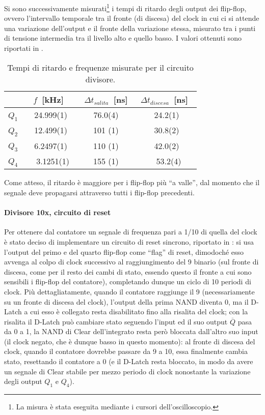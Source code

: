 Si sono successivamente misurati\footnote{La misura è stata eseguita mediante i cursori dell'oscilloscopio.} i tempi di ritardo degli output dei flip-flop, ovvero l'intervallo temporale tra il fronte (di discesa) del clock in cui ci si attende una variazione dell'output e il fronte della variazione stessa, misurato tra i punti di tensione intermedia tra il livello alto e quello basso. I valori ottenuti sono riportati in . %

\begin{table}[h]
	\centering
	\begin{tabular}{l S[table-figures-decimal=4, table-figures-uncertainty=1] S[table-figures-decimal=1, table-figures-integer=3, table-figures-uncertainty=1] S[table-figures-decimal=1, table-figures-uncertainty=1] }
		\toprule
			& {$f$ [\si{\kHz}]} & {$\Delta t_{salita}$ [\si{\ns}]} & {$\Delta t_{discesa}$ [\si{\ns}]} \\
		\midrule
		$Q_1$ & 24.999(1) & 76.0(4) & 24.2(1) \\
		$Q_2$ & 12.499(1) & 101 (1) & 30.8(2) \\
		$Q_3$ & 6.2497(1) & 110 (1) & 42.0(2) \\
		$Q_4$ & 3.1251(1) & 155 (1) & 53.2(4) \\
		\bottomrule
	\end{tabular}
	\caption{Tempi di ritardo e frequenze misurate per il circuito divisore.}
	\label{tab:divlag}
\end{table}

Come atteso, il ritardo è maggiore per i flip-flop più ``a valle'', dal momento che il segnale deve propagarsi attraverso tutti i flip-flop precedenti.

\paragraph{Divisore 10x, circuito di reset}
Per ottenere dal contatore un segnale di frequenza pari a 1/10 di quella del clock è stato deciso di implementare un circuito di reset sincrono, riportato in : si usa l'output del primo e del quarto flip-flop come ``flag'' di reset, dimodoché esso avvenga al colpo di clock successivo al raggiungimento del 9 binario (sul fronte di discesa, come per il resto dei cambi di stato, essendo questo il fronte a cui sono sensibili i flip-flop del contatore), completando dunque un ciclo di 10 periodi di clock.
Più dettagliatamente, quando il contatore raggiunge il 9 (necessariamente su un fronte di discesa del clock), l'output della prima NAND diventa 0, ma il D-Latch a cui esso è collegato resta disabilitato fino alla risalita del clock; con la risalita il D-Latch può cambiare stato seguendo l'input ed il suo output $\overline{Q}$ pasa da 0 a 1, la NAND di Clear dell'integrato resta però bloccata dall'altro suo input (il clock negato, che è dunque basso in questo momento): al fronte di discesa del clock, quando il contatore dovrebbe passare da 9 a 10, essa finalmente cambia stato, resettando il contatore a 0 (e il D-Latch resta bloccato, in modo da avere un segnale di Clear stabile per mezzo periodo di clock nonostante la variazione degli output $Q_1$ e $Q_4$).


